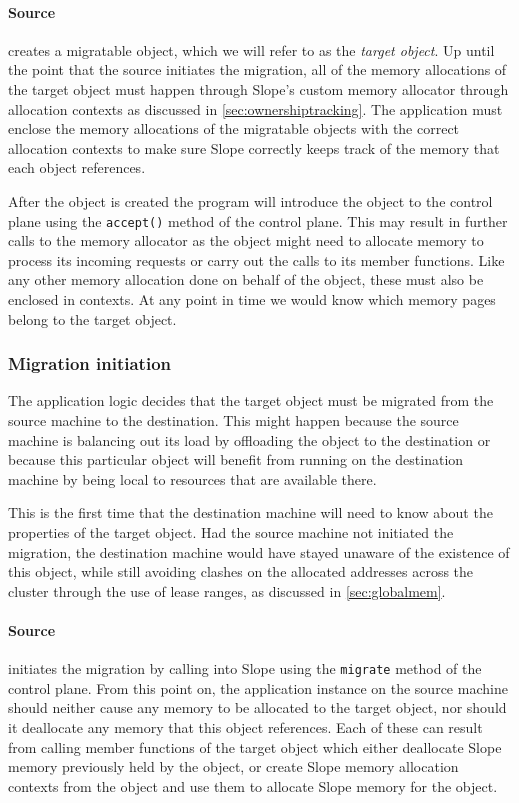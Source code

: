 \paragraph{Source}
creates a migratable object, which we will refer to as the \emph{target object}.
Up until the point that
the source initiates the migration, all of the memory allocations of the target object
must happen through
Slope's custom memory allocator through allocation contexts as discussed in
\autoref{sec:ownershiptracking}.
The application must enclose the memory allocations of the migratable objects
with the correct allocation contexts to make sure Slope correctly keeps track of the
memory that each object references.

After the object is created the program will introduce the object to the
control plane using the \texttt{accept()} method of the control plane.
This may result in further calls to the memory allocator as
the object might need to allocate memory to process its incoming
requests or carry out the calls to its member functions.
Like any other memory allocation done on behalf of the object, these must
also be enclosed in contexts. At any point in time we would know which
memory pages belong to the target object.

\subsubsection{Migration initiation}
The application logic decides that the target object must be migrated from the
source machine to the destination. This might happen because the source machine
is balancing out its load by offloading the object to the destination or because
this particular object will benefit from running on the destination machine
by being local to resources that are available there.

This is the first time that the destination
machine will need to know about the properties of the target object. Had the
source machine not initiated the migration, the destination machine would have
stayed unaware of the existence of this object, while still avoiding
clashes on the allocated addresses across the cluster through the
use of lease ranges, as discussed in \autoref{sec:globalmem}.

\paragraph{Source}
initiates the migration by calling into Slope using the \texttt{migrate} method of the control plane. From this point
on, the application instance on the source machine should neither
cause any memory to be allocated to the target object, nor should it deallocate any memory that
this object references. Each of these can result from calling member functions
of the target object which either deallocate Slope memory previously held by the
object, or create Slope memory allocation contexts from the object and
use them to allocate Slope memory for the object.


